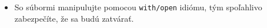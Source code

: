 \begin{itemize}
\item So súbormi manipulujte pomocou \texttt{with/open} idiómu, tým spoľahlivo zabezpečíte,
že sa budú zatvárať.
\end{itemize}
 
